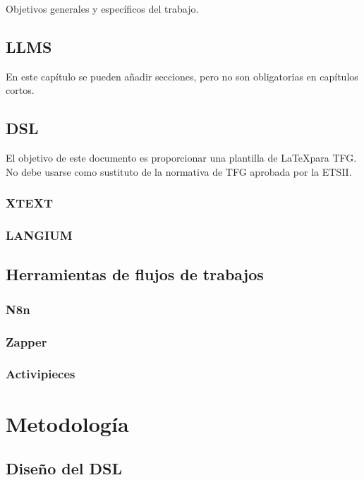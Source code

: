 \documentclass[12pt,twoside,titlepage]{report}
\newcommand\blankpage{%
    \newpage
    \null
    \thispagestyle{empty}%
    \newpage}
\begin{document}
Objetivos generales y específicos del trabajo.


\section{LLMS}

En este capítulo se pueden añadir secciones, pero no son obligatorias en capítulos cortos.

\section{DSL}

El objetivo de este documento es proporcionar una plantilla de \LaTeX para TFG. No debe usarse como sustituto de la normativa de TFG aprobada por la ETSII.

\subsection{XTEXT}


\subsection{LANGIUM}


\section{Herramientas de flujos de trabajos}


\subsection{N8n}


\subsection{Zapper}


\subsection{Activipieces}

\blankpage


\chapter{Metodología}
\label{chap:contenidos}


\section{Diseño del DSL}
\end{document}
